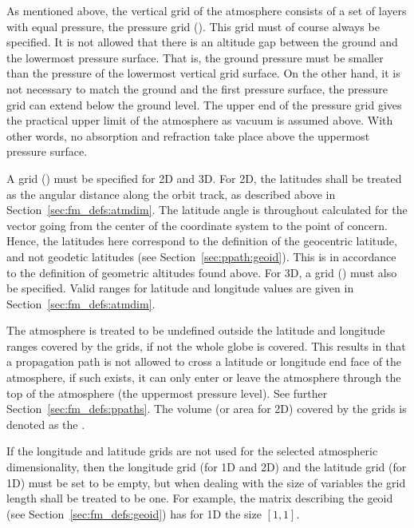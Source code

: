 \label{sec:fm_defs:grids}

As mentioned above, the vertical grid of the atmosphere consists of a
set of layers with equal pressure, the pressure grid
().  This grid must of course always be specified.
It is not allowed that there is an altitude gap between the ground and
the lowermost pressure surface.  That is, the ground pressure must be
smaller than the pressure of the lowermost vertical grid surface. On
the other hand, it is not necessary to match the ground and the first
pressure surface, the pressure grid can extend below the ground level.
The upper end of the pressure grid gives the practical upper limit of
the atmosphere as vacuum is assumed above. With other words, no
absorption and refraction take place above the uppermost pressure
surface.

A  grid () must be specified
for 2D and 3D.  For 2D, the latitudes shall be treated as the angular
distance along the orbit track, as described above in
Section~\ref{sec:fm_defs:atmdim}.  The latitude angle is throughout
calculated for the vector going from the center of the coordinate
system to the point of concern. Hence, the latitudes here correspond
to the definition of the geocentric latitude, and not geodetic
latitudes (see Section~\ref{sec:ppath:geoid}). This is in accordance
to the definition of geometric altitudes found above.  For 3D, a
 grid () must also be specified.
Valid ranges for latitude and longitude values are given in
Section~\ref{sec:fm_defs:atmdim}.

The atmosphere is treated to be undefined outside the latitude and
longitude ranges covered by the grids, if not the whole globe is
covered. This results in that a propagation path is not allowed to
cross a latitude or longitude end face of the atmosphere, if such
exists, it can only enter or leave the atmosphere through the top of
the atmosphere (the uppermost pressure level). See further
Section~\ref{sec:fm_defs:ppaths}. The volume (or area for 2D) covered
by the grids is denoted as the .

If the longitude and latitude grids are not used for the selected
atmospheric dimensionality, then the longitude grid (for 1D and 2D)
and the latitude grid (for 1D) must be set to be empty, but when
dealing with the size of variables the grid length shall be treated to
be one. For example, the matrix describing the geoid (see
Section~\ref{sec:fm_defs:geoid}) has for 1D the size $[1,1]$.

